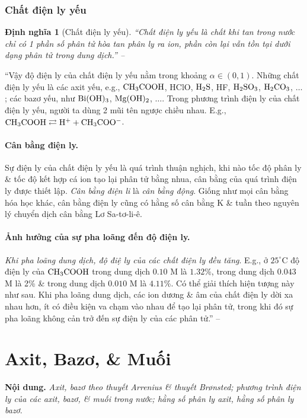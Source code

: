 \documentclass[oneside]{book}
\numberwithin{equation}{section}
\newtheorem{dinhnghia}{Định nghĩa}[section]
\begin{document}
\subsubsection{Chất điện ly yếu}

\begin{dinhnghia}[Chất điện ly yếu]
	``\emph{Chất điện ly yếu} là chất khi tan trong nước chỉ có 1 phần số phân tử hòa tan phân ly ra ion, phần còn lại vẫn tồn tại dưới dạng phân tử trong dung dịch.'' -- \cite[p. 9]{SGK_Hoa_Hoc_11_nang_cao}
\end{dinhnghia}
``Vậy độ điện ly của chất điện ly yếu nằm trong khoảng $\alpha\in(0,1)$. Những chất điện ly yếu là các axit yếu, e.g., $\rm CH_3COOH$, HClO, $\rm H_2S$, HF, $\rm H_2SO_3$, $\rm H_2CO_3$, $\ldots$; các bazơ yếu, như $\rm Bi(OH)_3$, $\rm Mg(OH)_2$, $\ldots$. Trong phương trình điện ly của chất điện ly yếu, người ta dùng 2 mũi tên ngược chiều nhau. E.g., $\rm CH_3COOH\rightleftarrows H^+ + CH_3COO^-$.

\paragraph{Cân bằng điện ly.} Sự điện ly của chất điện ly yếu là quá trình thuận nghịch, khi nào tốc độ phân ly \& tốc độ kết hợp cá ion tạo lại phân tử bằng nhua, cân bằng của quá trình điện ly được thiết lập. \textit{Cân bằng điện li} là \textit{cân bằng động}. Giống như mọi cân bằng hóa học khác, cân bằng điện ly cũng có hằng số cân bằng K \& tuần theo nguyên lý chuyển dịch cân bằng Lơ Sa-tơ-li-ê.

\paragraph{Ảnh hưởng của sự pha loãng đến độ điện ly.} \textit{Khi pha loãng dung dịch, độ điệ ly của các chất điện ly đều tăng}. E.g., ở $25^\circ$C độ điện ly của $\rm CH_3COOH$ trong dung dịch $0.10$ M là $1.32$\%, trong dung dịch $0.043$ M là 2\% \& trong dung dịch $0.010$ M là $4.11$\%. Có thể giải thích hiện tượng này như sau. Khi pha loãng dung dịch, các ion dương \& âm của chất điện ly dời xa nhau hơn, ít có điều kiện va chạm vào nhau để tạo lại phân tử, trong khi đó sự pha loãng không cản trở đến sự điện ly của các phân tử.'' -- \cite[pp. 9--10]{SGK_Hoa_Hoc_11_nang_cao}


\section{Axit, Bazơ, \& Muối}
\textbf{Nội dung.} \textit{Axit, bazơ theo thuyết Arrenius \& thuyết Br\o nsted; phương trình điện ly của các axit, bazơ, \& muối trong nước; hằng số phân ly axit, hằng số phân ly bazơ}.
\end{document}
